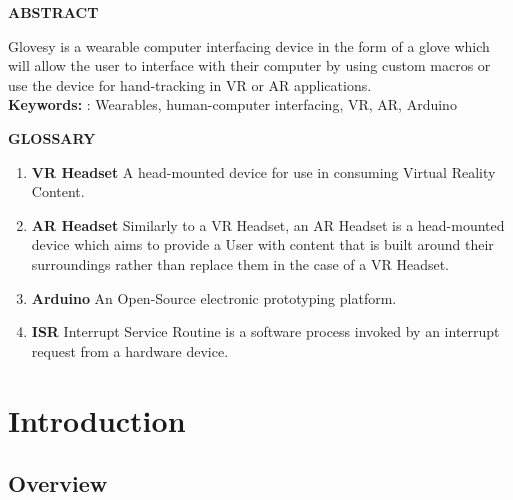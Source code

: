 \documentclass[12pt,a4paper,oneside]{book}
\theoremstyle{plain}
\numberwithin{equation}{chapter}
\renewcommand{\contentsname}{\hfill\bfseries\Large TABLE OF CONTENTS \hfill}
\renewcommand{\listfigurename}{\hfill\bfseries\Large LIST OF FIGURES}
\newcounter{Chapnum}
\newcounter{Secnum}
\begin{document}
\newpage

\begin{center}
  \large\textbf{ABSTRACT}\\
\end{center}
\noindent Glovesy is a wearable computer interfacing device in the form of a glove which will allow the user to interface with their computer by using custom macros or use the device for hand-tracking in VR or AR applications. \\
\noindent \textbf{Keywords:} : Wearables, human-computer interfacing, VR, AR, Arduino

\begin {center}
    \large\textbf{GLOSSARY}
\end{center}
\begin{enumerate}
    \item \textbf{VR Headset} A head-mounted device for use in consuming Virtual Reality Content.
    \item \textbf{AR Headset} Similarly to a VR Headset, an AR Headset is a head-mounted device which aims to provide a User with content that is built around their surroundings rather than replace them in the case of a VR Headset.
    \item \textbf{Arduino} An Open-Source electronic prototyping platform.
    \item \textbf{ISR} Interrupt Service Routine is a software process invoked by an interrupt request from a hardware device.
\end{enumerate}

\newpage

\renewcommand{\contentsname}{TABLE OF CONTENTS}

\newpage
\tableofcontents

{}
\renewcommand{\listfigurename}{LIST OF FIGURES}
\listoffigures

\newpage
\renewcommand*\thesection{\arabic{Chapnum}.\arabic{Secnum}}
\chapter*{\textbf{Introduction}}

\section{\textbf{Overview}}
\end{document}
